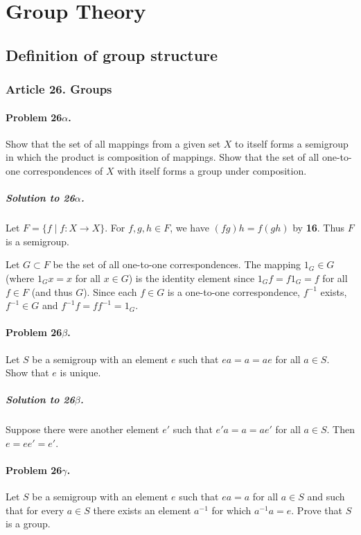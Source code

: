 \chapter{Group Theory}

\section{Definition of group structure}

\subsection{Article 26. Groups}
\subsubsection{Problem 26$\alpha$.}
Show that the set of all mappings from a given set $X$ to itself forms a
semigroup in which the product is composition of mappings. Show that the
set of all one-to-one correspondences of $X$ with itself forms a group
under composition.

\paragraph*{Solution to 26$\alpha$.}
Let $F = \{ f \mid f : X \rightarrow X \}$. For $ f, g, h \in F$, we have
$(fg)h = f(gh)$ by \textbf{16}. Thus $F$ is a semigroup.

Let $ G \subset F$ be the set of all one-to-one correspondences. The mapping
$ 1_G \in G $ (where $1_G x = x$ for all $ x \in G$) is the identity element
since $1_G f = f 1_G = f $ for all $ f \in F$ (and thus $G$). Since each
$f \in G$ is a one-to-one correspondence, $ f^{-1} $ exists, $ f^{-1} \in G$ and
$f^{-1} f = f f^{-1} = 1_G$.

\subsubsection{Problem 26$\beta$.}
Let $S$ be a semigroup with an element $e$ such that $ea = a = ae$ for all
$a \in S$. Show that $e$ is unique.

\paragraph*{Solution to 26$\beta$.}
Suppose there were another element $e'$ such that $e'a = a = ae'$ for all
$a \in S$. Then $ e = ee' = e'$.

\subsubsection{Problem 26$\gamma$.}
Let $S$ be a semigroup with an element $e$ such that $ea = a$ for all $a \in S$
and such that for every $a \in S$ there exists an element $a^{-1}$ for which
$a^{-1} a = e$. Prove that $S$ is a group.

